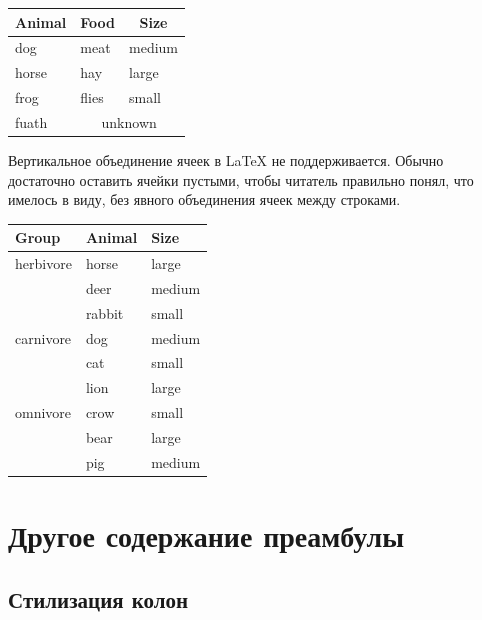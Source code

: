 \documentclass{article}
\begin{document}
  \smallskip

  \begin{tabular}{lll}
  \toprule
  \multicolumn{1}{c}{Animal} & \multicolumn{1}{c}{Food} &
  \multicolumn{1}{c}{Size} \\
  \midrule
    dog & meat & medium \\
    horse & hay & large \\
    frog & flies & small \\
    fuath & \multicolumn{2}{c}{unknown} \\
  \bottomrule
  \end{tabular}

  \smallskip

  Вертикальное объединение ячеек в LaTeX не поддерживается. Обычно достаточно оставить ячейки
  пустыми, чтобы читатель правильно понял, что имелось в виду, без явного
  объединения ячеек между строками.


    \smallskip

  \begin{tabular}{lll}
  \toprule
    Group & Animal & Size \\
  \midrule
    herbivore & horse & large \\
    & deer & medium \\
    & rabbit & small \\
  \addlinespace
    carnivore & dog & medium \\
    & cat & small \\
    & lion & large \\
  \addlinespace
    omnivore & crow & small \\
    & bear & large \\
    & pig & medium \\
  \bottomrule
  \end{tabular}











  \section{Другое содержание преамбулы}
  \label{sec:other}

  \subsection{Стилизация колон}
  \label{subsec:width}
  
\end{document}
